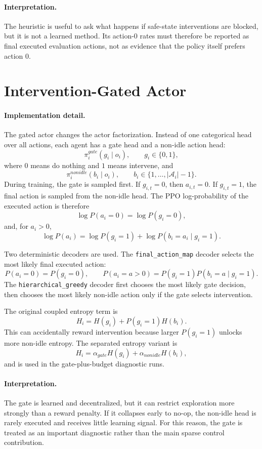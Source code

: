 \paragraph{Interpretation.}
The heuristic is useful to ask what happens if safe-state interventions are
blocked, but it is not a learned method. Its action-0 rates must therefore be
reported as final executed evaluation actions, not as evidence that the policy
itself prefers action \(0\).

\section{Intervention-Gated Actor}
\label{subsec:sparse-control-gate}

\paragraph{Implementation detail.}
The gated actor changes the actor factorization. Instead of one categorical
head over all actions, each agent has a gate head and a non-idle action head:
\[
  \pi_i^{gate}(g_i\mid o_i),\qquad g_i\in\{0,1\},
\]
where \(0\) means do nothing and \(1\) means intervene, and
\[
  \pi_i^{nonidle}(b_i\mid o_i),\qquad
  b_i\in\{1,\ldots,|\mathcal A_i|-1\}.
\]
During training, the gate is sampled first. If \(g_{i,t}=0\), then
\(a_{i,t}=0\). If \(g_{i,t}=1\), the final action is sampled from the non-idle
head. The PPO log-probability of the executed action is therefore
\[
  \log P(a_i=0)=\log P(g_i=0),
\]
and, for \(a_i>0\),
\[
  \log P(a_i)=\log P(g_i=1)+\log P(b_i=a_i\mid g_i=1).
\]

Two deterministic decoders are used. The \texttt{final\_action\_map} decoder
selects the most likely final executed action:
\[
  P(a_i=0)=P(g_i=0),\qquad
  P(a_i=a>0)=P(g_i=1)P(b_i=a\mid g_i=1).
\]
The \texttt{hierarchical\_greedy} decoder first chooses the most likely gate
decision, then chooses the most likely non-idle action only if the gate selects
intervention.

The original coupled entropy term is
\[
  H_i=H(g_i)+P(g_i=1)H(b_i).
\]
This can accidentally reward intervention because larger \(P(g_i=1)\) unlocks
more non-idle entropy. The separated entropy variant is
\[
  H_i=\alpha_{gate}H(g_i)+\alpha_{nonidle}H(b_i),
\]
and is used in the gate-plus-budget diagnostic runs.

\paragraph{Interpretation.}
The gate is learned and decentralized, but it can restrict exploration more
strongly than a reward penalty. If it collapses early to no-op, the non-idle
head is rarely executed and receives little learning signal. For this reason,
the gate is treated as an important diagnostic rather than the main sparse
control contribution.

